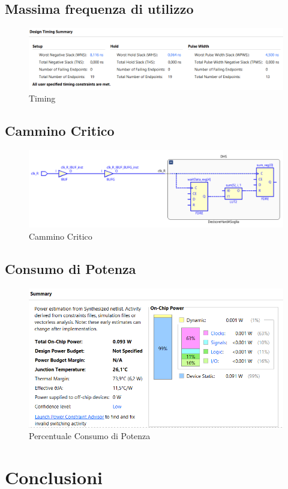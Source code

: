 \documentclass[a4paper,12pt]{article}
\begin{document}
  \subsection{Massima frequenza di utilizzo}
    \begin{figure}[H]
      \centering
      \includegraphics[width=\textwidth]{img/FrequenzaMassima.png}
      \caption{Timing}
      \label{fig:timing}
    \end{figure}
  \subsection{Cammino Critico}
    \begin{figure}[H]
      \centering
      \includegraphics[width=\textwidth]{img/CamminoCritico.png}
      \caption{Cammino Critico}
      \label{fig:critico}
    \end{figure}
  \subsection{Consumo di Potenza}
    \begin{figure}[H]
      \centering
      \includegraphics[width=\textwidth]{img/Power.png}
      \caption{Percentuale Consumo di Potenza}
      \label{fig:power}
    \end{figure}
\section{Conclusioni}
\end{document}
